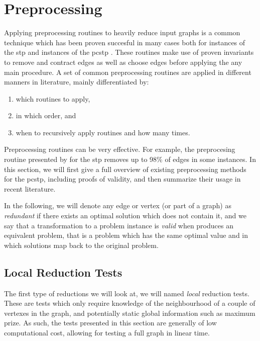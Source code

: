  \section{Preprocessing}
 \label{sec:solving:pre}
Applying preprocessing routines to heavily reduce input graphs is a common technique which has been proven succesful in many cases both for instances of the \gls{stp}
\citep{koch1998solving}
and instances of the \gls{pcstp}
\citep{lucena2004strong,canuto2001local,ljubic2005solving, gamrath2017scip}. %
These routines make use of proven invariants to remove and contract edges as well as choose edges before applying the any main procedure.
A set of common preprocessing routines are applied in different manners in literature, mainly differentiated by:
\begin{enumerate}[label=\alph*)]
\item which routines to apply,
\item in which order, and
\item when to recursively apply routines and how many times.
\end{enumerate}
Preprocessing routines can be very effective. For example, the preprocesing routine presented by \cite{koch1998solving} for the \gls{stp} removes
up to 98\% of edges in some instances. In this section, we will first give a full overview of existing preprocessing methods for the \gls{pcstp},
 including proofs of validity,
 and then summarize their usage in recent literature.

 In the following, we will denote any edge or vertex (or part of a graph) as \textit{redundant} if there exists an optimal solution
  which does not contain it, and we say that a 
  transformation to a problem instance is \textit{valid} when produces an equivalent problem, that is a problem which has the same optimal
  value and in which solutions map back to the original problem.

 \subsection{Local Reduction Tests}\label{sec:pre:local}
 The first type of reductions we will look at, we will named \textit{local} reduction tests. These are tests which only require knowledge
 of the neighbourhood of a couple of vertexes in the graph, and potentially static global information
 such as maximum prize. As such, the tests
 presented in this section are generally of low computational cost, allowing for testing a full graph in linear time.

